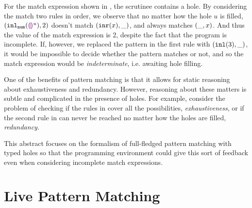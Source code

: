 \documentclass[runningheads,envcountsame,a4paper]{llncs}
\begin{document}
For the match expression shown in , the scrutinee contains a hole.
By considering the match two rules in order, we observe that
no matter how the hole $u$ is filled, $(\mathtt{inl}_{\mathtt{num}}({\textcolor{violet}{\llparenthesis}\textcolor{violet}{\rrparenthesis}^{u}}) , 2)$ doesn't match $(\mathtt{inr}(x) , \_)$,
and always matches $(\_ , x)$. And thus the value of the match expression is $2$, despite the fact that the program is incomplete.
If, however, we replaced the pattern in the first rule with $(\mathtt{inl}(3), \_)$, it would be impossible to decide whether the pattern matches
or not, and so the match expression would be \emph{indeterminate}, i.e. awaiting hole filling.

One of the benefits of pattern matching is that it allows for static reasoning about exhaustiveness and redundancy.
However, reasoning about these matters is subtle and complicated in the presence of holes. 
For example, consider the problem of checking if the rules in  cover all the possibilities, \ie \emph{exhaustiveness}, or if the second rule in  can never be reached no matter how the holes are filled, \ie \emph{redundancy}. 

This abstract focuses on the formalism of full-fledged pattern matching with typed holes so that the programming environment could give this sort of feedback even when considering incomplete match expressions.

\section{Live Pattern Matching}\label{sec:examples}
\end{document}
